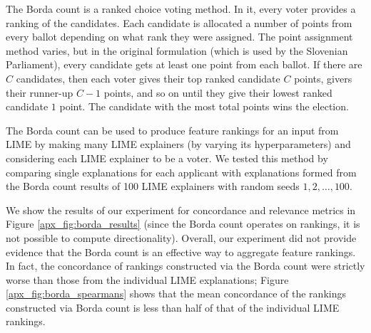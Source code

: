 \documentclass[mnsc,blindrev]{informs3}
\begin{document}
            The Borda count is a ranked choice voting method. In it, every voter provides a ranking of the candidates. Each candidate is allocated a number of points from every ballot depending on what rank they were assigned. The point assignment method varies, but in the original formulation (which is used by the Slovenian Parliament), every candidate gets at least one point from each ballot. If there are $C$ candidates, then each voter gives their top ranked candidate $C$ points, givers their runner-up $C-1$ points, and so on until they give their lowest ranked candidate $1$ point. The candidate with the most total points wins the election.

            The Borda count can be used to produce feature rankings for an input from LIME by making many LIME explainers (by varying its hyperparameters) and considering each LIME explainer to be a voter. We tested this method by comparing single explanations for each applicant with explanations formed from the Borda count results of 100 LIME explainers with random seeds $1,2,\ldots,100$.
            
             We show the results of our experiment for concordance and relevance metrics in Figure \ref{apx_fig:borda_results} (since the Borda count operates on rankings, it is not possible to compute directionality). Overall, our experiment did not provide evidence that the Borda count is an effective way to aggregate feature rankings. In fact, the concordance of rankings constructed via the Borda count were strictly worse than those from the individual LIME explanations; Figure \ref{apx_fig:borda_spearmans} shows that the mean concordance of the rankings constructed via Borda count is less than half of that of the individual LIME rankings.
\end{document}
